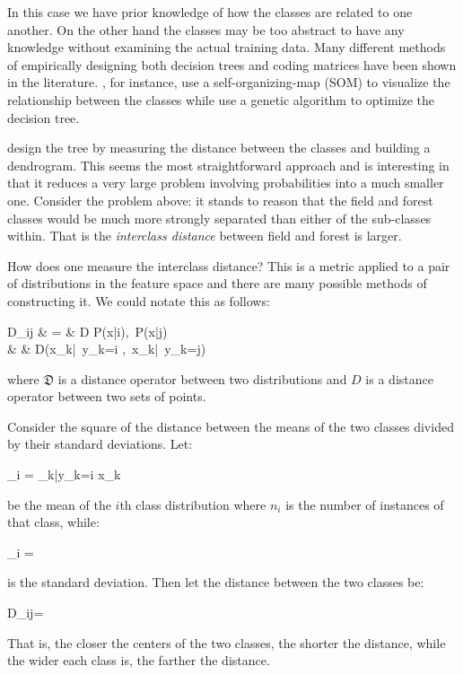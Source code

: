 In this case we have prior knowledge of how the classes are related to one another.
On the other hand the classes may be too abstract to have any knowledge without examining the actual training data.
Many different methods of empirically designing both decision trees and coding matrices have been shown in the literature.
\citet{Cheong_etal2004}, for instance, use a self-organizing-map (SOM)
\citep{Kohonen2000} to visualize the relationship between the classes while
\citet{Lee_Oh2003} use a genetic algorithm to optimize the decision tree.

\citet{Benabdeslem_Bennani2006} design the tree by measuring the distance between
the classes and building a dendrogram.
This seems the most straightforward approach and is interesting in that it reduces a very large problem involving probabilities into a much smaller one.
Consider the problem above: it stands to reason that the field and forest classes would be much more strongly separated than either of the sub-classes within.
That is the {\it interclass distance} between field and forest is larger.

How does one measure the interclass distance? 
This is a metric applied to a pair of distributions in the feature space
and there are many possible methods of constructing it.
We could notate this as follows:
\begin{eqnarraynon}
	D_{ij} & = & \mathfrak D \left \lbrace P(\vec x|i),~P(\vec x|j) \right \rbrace \\
	       & \approx & D\left (\lbrace \vec x_k|~y_k=i \rbrace,~\lbrace \vec x_k|~y_k=j\rbrace \right )
\end{eqnarraynon}
where $\mathfrak D$ is a distance operator between two distributions and $D$ is a distance operator between two sets of points.

Consider the square of the distance between the means of the two classes divided by their standard deviations. Let:
\begin{eqnnon}
	\vec \mu_i =  \sum_{k|y_k=i} \vec x_k
\end{eqnnon}
be the mean of the $i$th class distribution where $n_i$ is the number of instances of that class, while:
\begin{eqnnon}
	\sigma_i = 
\end{eqnnon}
is the standard deviation.
Then let the distance between the two classes be:
\begin{eqnnon}
	D_{ij}=
\end{eqnnon}
That is, the closer the centers of the two classes, the shorter the distance, while the wider each class is, the farther the distance.
	
